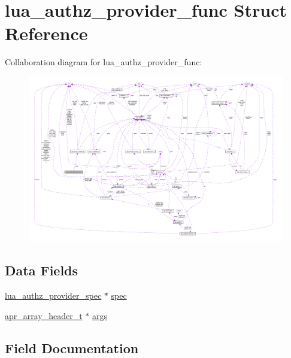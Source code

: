 \hypertarget{structlua__authz__provider__func}{}\section{lua\+\_\+authz\+\_\+provider\+\_\+func Struct Reference}
\label{structlua__authz__provider__func}


Collaboration diagram for lua\+\_\+authz\+\_\+provider\+\_\+func\+:
\nopagebreak
\begin{figure}[H]
\begin{center}
\leavevmode
\includegraphics[width=350pt]{structlua__authz__provider__func__coll__graph}
\end{center}
\end{figure}
\subsection*{Data Fields}
\begin{DoxyCompactItemize}
\item 
\hyperlink{mod__lua_8c_aa88b3bc80669ed5c89fe25304539de23}{lua\+\_\+authz\+\_\+provider\+\_\+spec} $\ast$ \hyperlink{structlua__authz__provider__func_af79edbeacc9a56520aa47a2b9324fd39}{spec}
\item 
\hyperlink{structapr__array__header__t}{apr\+\_\+array\+\_\+header\+\_\+t} $\ast$ \hyperlink{structlua__authz__provider__func_a4567a8636199bce9da85068308f175e9}{args}
\end{DoxyCompactItemize}


\subsection{Field Documentation}
